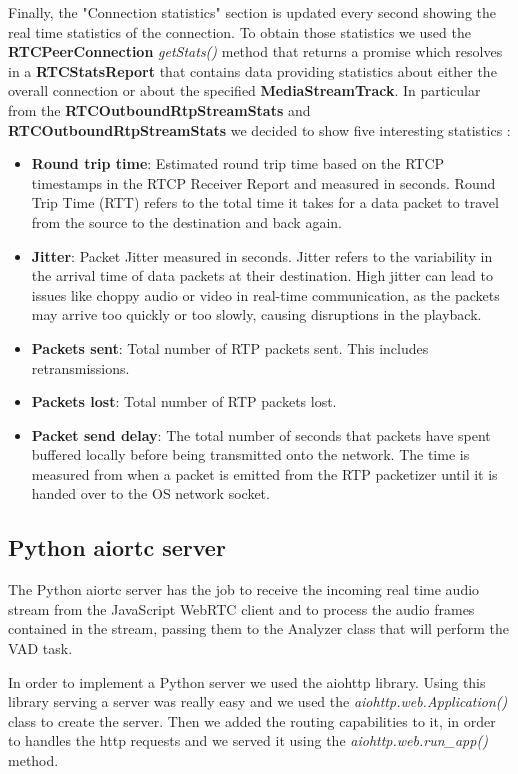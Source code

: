 \documentclass[../main.tex]{subfiles}
\begin{document}
Finally, the "Connection statistics" section is updated every second showing the real time statistics of the connection. To obtain those statistics we used the \textbf{RTCPeerConnection} \textit{getStats()} method that returns a promise which resolves in a \textbf{RTCStatsReport} that contains data providing statistics about either the overall connection or about the specified \textbf{MediaStreamTrack}. In particular from the \textbf{RTCOutboundRtpStreamStats} and \textbf{RTCOutboundRtpStreamStats} we decided to show five interesting statistics \cite{statistics}:

\begin{itemize}
    \item \textbf{Round trip time}: Estimated round trip time based on the RTCP timestamps in the RTCP Receiver Report and measured in seconds. Round Trip Time (RTT) refers to the total time it takes for a data packet to travel from the source to the destination and back again.
    \item \textbf{Jitter}: Packet Jitter measured in seconds. Jitter refers to the variability in the arrival time of data packets at their destination. High jitter can lead to issues like choppy audio or video in real-time communication, as the packets may arrive too quickly or too slowly, causing disruptions in the playback.
    \item \textbf{Packets sent}: Total number of RTP packets sent. This includes retransmissions.
    \item \textbf{Packets lost}: Total number of RTP packets lost.
    \item \textbf{Packet send delay}: The total number of seconds that packets have spent buffered locally before being transmitted onto the network. The time is measured from when a packet is emitted from the RTP packetizer until it is handed over to the OS network socket.
\end{itemize}


\subsection{Python aiortc server}

The Python aiortc server has the job to receive the incoming real time audio stream from the JavaScript WebRTC client and to process the audio frames contained in the stream, passing them to the Analyzer class that will perform the VAD task. 

In order to implement a Python server we used the aiohttp library. Using this library serving a server was really easy and we used the \textit{aiohttp.web.Application()} class to create the server. Then we added the routing capabilities to it, in order to handles the http requests and we served it using the \textit{aiohttp.web.run\_app()} method. 
\end{document}
